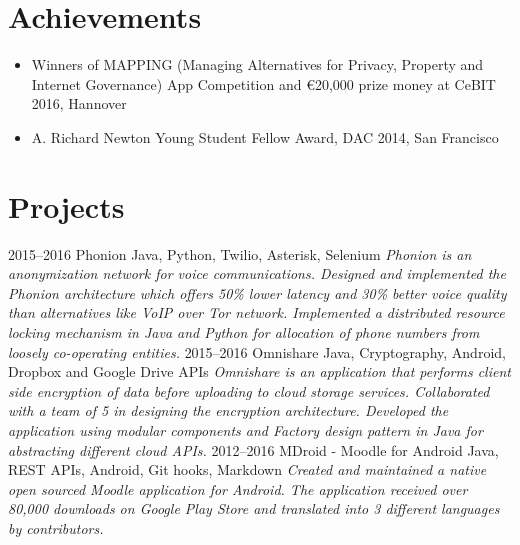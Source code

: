 \documentclass[]{friggeri-cv}
\begin{document}
\vspace{0.3cm}

\section{Achievements}
\begin{itemize}
    \item Winners of MAPPING (Managing Alternatives for Privacy, Property and Internet Governance) App Competition and \euro 20,000 prize money at CeBIT 2016, Hannover
    \item A. Richard Newton Young Student Fellow Award, DAC 2014, San Francisco
\end{itemize}
\vspace{0.3cm}

\section{Projects}
    \begin{entrylist}
        \entry
            {2015–2016}
            {Phonion}
            {Java, Python, Twilio, Asterisk, Selenium}
            {\emph{Phonion is an anonymization network for voice communications. Designed and implemented the Phonion architecture which offers 50\% lower latency and 30\% better voice quality than alternatives like VoIP over Tor network. Implemented a distributed resource locking mechanism in Java and Python for allocation of phone numbers from loosely co-operating entities.}}
        \entry
            {2015–2016}
            {Omnishare}
            {Java, Cryptography, Android, Dropbox and Google Drive APIs}
            {\emph{Omnishare is an application that performs client side encryption of data before uploading to cloud storage services. Collaborated with a team of 5 in designing the encryption architecture. Developed the application using modular components and Factory design pattern in Java for abstracting different cloud APIs.}}
        \entry
            {2012–2016}
            {MDroid - Moodle for Android}
            {Java, REST APIs, Android, Git hooks, Markdown}
            {\emph{Created and maintained a native open sourced Moodle application for Android. The application received over 80,000 downloads on Google Play Store and translated into 3 different languages by contributors.}}
    \end{entrylist}
\end{document}

